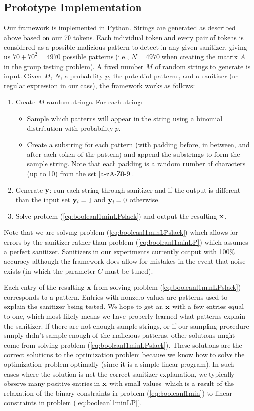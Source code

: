 \subsection{Prototype Implementation}
Our framework is implemented in Python. Strings are generated as described above based on our 70 tokens. Each individual token and every pair of tokens is considered as a possible malicious pattern to detect in any given sanitizer, giving us $70+70^2=4970$ possible patterns (i.e., $N=4970$ when creating the matrix $A$ in the group testing problem). A fixed number $M$ of random strings to generate is input. Given $M$, $N$, a probability $p$, the potential patterns, and a sanitizer (or regular expression in our case), the framework works as follows:
\begin{enumerate}
	\item Create $M$ random strings. For each string:
		\begin{itemize}
			\item Sample which patterns will appear in the string using a binomial distribution with probability $p$.
			\item Create a substring for each pattern (with padding before, in between, and after each token of the pattern) and append the substrings to form the sample string. Note that each padding is a random number of characters (up to 10) from the set [a-zA-Z0-9].
		\end{itemize}
	\item Generate $\mathbf{y}$: run each string through sanitizer and if the output is different than the input set $\mathbf{y}_i=1$ and $\mathbf{y}_i=0$ otherwise.
	\item Solve problem (\ref{eq:booleanl1minLPslack}) and output the resulting $\mathbf{x}$.
\end{enumerate}
Note that we are solving problem (\ref{eq:booleanl1minLPslack}) which allows for errors by the sanitizer rather than problem (\ref{eq:booleanl1minLP}) which assumes a perfect sanitizer. Sanitizers in our experiments currently output with 100\% accuracy although the framework does allow for mistakes in the event that noise exists (in which the parameter $C$ must be tuned).

Each entry of the resulting $\mathbf{x}$ from solving problem (\ref{eq:booleanl1minLPslack}) corresponds to a pattern.  Entries with nonzero values are patterns used to explain the sanitizer being tested. We hope to get an $\mathbf{x}$ with a few entries equal to one, which most likely means we have properly learned what patterns explain the sanitizer. If there are not enough sample strings, or if our sampling procedure simply didn't sample enough of the malicious patterns, other solutions might come from solving problem (\ref{eq:booleanl1minLPslack}). These solutions are the correct solutions to the optimization problem because we know how to solve the optimization problem optimally (since it is a simple linear program). In such cases where the solution is not the correct sanitizer explanation, we typically observe many positive entries in $\mathbf{x}$ with small values, which is a result of the relaxation of the binary constraints in problem (\ref{eq:booleanl1min}) to linear constraints in problem (\ref{eq:booleanl1minLP}).

